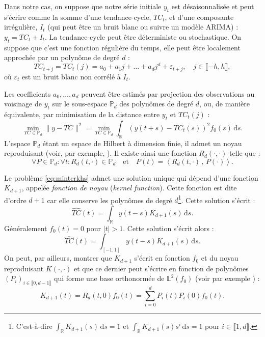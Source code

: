 \documentclass[
  12pt,
  french,
  12pt,a4paper]{article}
\newcommand\R{\mathds{R}}
\newcommand\1{\mathds{1}}
\newcommand\ud{\,\mathrm{d}}
\newcommand{\ps}[2]{\left\langle #1 \,,\, #2 \right\rangle}
\begin{document}
Dans notre cas, on suppose que notre série initiale \(y_t\) est désaisonnalisée et peut s'écrire comme la somme d'une tendance-cycle, \(TC_t\), et d'une composante irrégulière, \(I_t\) (qui peut être un bruit blanc ou suivre un modèle ARIMA) :
\(y_t=TC_t+I_t.\)
La tendance-cycle peut être déterministe ou stochastique. On suppose que c'est une fonction régulière du temps, elle peut être localement approchée par un polynôme de degré \(d\) :
\[
TC_{t+j}=TC_t(j)=a_0+a_1j+\dots+a_dj^d+\varepsilon_{t+j},\quad
j\in\llbracket-h,h\rrbracket,
\]
où \(\varepsilon_t\) est un bruit blanc non corrélé à \(I_t\).

Les coefficients \(a_0,\dots,a_d\) peuvent être estimés par projection des observations au voisinage de \(y_t\) sur le sous-espace \(\mathbb P_d\) des polynômes de degré \(d\), ou, de manière équivalente, par minimisation de la distance entre \(y_t\) et \(TC_t(j)\) :
\begin{equation}
\underset{TC\in\mathbb P_d}{\min}\lVert y -TC \rVert^2 = 
\underset{TC\in\mathbb P_d}{\min}\int_\R (y(t+s)-TC_t(s))^2f_0(s)\ud s.
\label{eq:mintcrkhs}
\end{equation}
L'espace \(\mathbb P_d\) étant un espace de Hilbert à dimension finie, il admet un noyau reproduisant (voir, par exemple, \textcite{berlinet2004}).
Il existe ainsi une fonction \(R_d(\cdot,\cdot)\) telle que :
\[
\forall P\in \mathbb P_d: \forall t:
R_d(t,\cdot)\in\mathbb P_d\quad\text{et}\quad
P(t)=\ps{R_d(t,\cdot)}{P(\cdot)}.
\]

Le problème \eqref{eq:mintcrkhs} admet une solution unique qui dépend d'une fonction \(K_{d+1}\), appelée \emph{fonction de noyau} (\emph{kernel function}).
Cette fonction est dite d'ordre \(d+1\) car elle conserve les polynômes de degré \(d\)\footnote{
  C'est-à-dire \(\int_\R K_{d+1}(s)\ud s = 1\) et \(\int_\R K_{d+1}(s) s^i\ud s = 1\) pour \(i\in \llbracket 1, d\rrbracket\).}.
Cette solution s'écrit :
\begin{equation}
\widehat{TC}(t)=\int_\R y(t-s)K_{d+1}(s) \ud s.
\label{eq:rkhssoltc}
\end{equation}
Généralement \(f_0(t) = 0\) pour \(\lvert t \rvert>1\).
Cette solution s'écrit alors :
\begin{equation}
\widehat{TC}(t)=\int_{[-1,1]} y(t-s)K_{d+1}(s) \ud s.
\label{eq:rkhssoltc2}
\end{equation}
On peut, par ailleurs, montrer que \(K_{d+1}\) s'écrit en fonction \(f_0\) et du noyau reproduisant \(K(\cdot,\cdot)\) et que ce dernier peut s'écrire en fonction de polynômes \((P_i)_{i\in \llbracket 0, d-1 \rrbracket}\) qui forme une base orthonormée de \(\mathbb L^2(f_0)\) (voir par exemple \textcite{berlinet1993}) :
\[
K_{d+1}(t) = R_d(t,0)f_0(t) = \sum_{i=0}^dP_i(t)P_i(0)f_0(t).
\]
\end{document}
